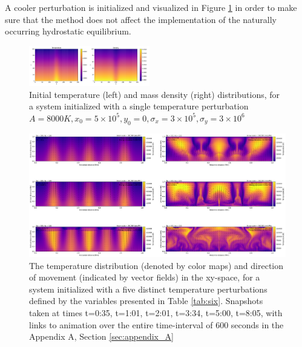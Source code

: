 \documentclass[10pt, nofootinbib, twocolumn]{revtex4-1}
\begin{document}
A cooler perturbation is initialized and visualized in Figure \ref{fig:small_single} in order to make sure that the method does not affect the implementation of the naturally occurring hydrostatic equilibrium.
\begin{figure}[H]
    \centering
    \includegraphics[width = 0.47\textwidth]{figures/initial_two_single_small.pdf}
    \caption{Initial temperature (left) and mass density (right) distributions, for a system initialized with a single temperature perturbation $A=8000 K, x_0=5\times 10^5, y_0=0, \sigma_x=3\times 10^5, \sigma_y=3\times 10^6$}
    \label{fig:small_single}
\end{figure}
\begin{figure}
    \centering
    \includegraphics[width =1\textwidth]{figures/five_collage.png} 
    \caption{The temperature distribution (denoted by color maps) and direction of movement (indicated by vector fields) in the xy-space, for a system initialized with a five distinct temperature perturbations defined by the variables presented in Table \ref{tab:six}. Snapshots taken at times t=0:35, t=1:01, t=2:01, t=3:34, t=5:00, t=8:05, with links to animation over the entire time-interval of 600 seconds in the Appendix A, Section \ref{sec:appendix_A}}
    \label{fig:five_shots}
\end{figure}
\end{document}
